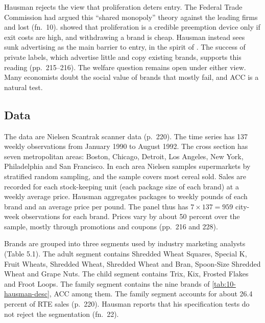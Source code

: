Hausman rejects the view that proliferation deters entry. The Federal Trade Commission had argued this
``shared monopoly'' theory against the leading firms and lost (fn.~10). \citet{Judd1985} showed that
proliferation is a credible preemption device only if exit costs are high, and withdrawing a brand is cheap.
Hausman instead sees sunk advertising as the main barrier to entry, in the spirit of \citet{Sutton1991}. The
success of private labels, which advertise little and copy existing brands, supports this reading
(pp.~215--216). The welfare question remains open under either view. Many economists doubt the social value
of brands that mostly fail, and ACC is a natural test.

\subsection{Data}\label{sec:10-hausman-data}

The data are Nielsen Scantrak scanner data (p.~220). The time series has 137 weekly observations from
January 1990 to August 1992. The cross section has seven metropolitan areas: Boston, Chicago, Detroit,
Los Angeles, New York, Philadelphia and San Francisco. In each area Nielsen samples supermarkets by
stratified random sampling, and the sample covers most cereal sold. Sales are recorded for each stock-keeping
unit (each package size of each brand) at a weekly average price. Hausman aggregates packages to weekly
pounds of each brand and an average price per pound. The panel thus has $7 \times 137 = 959$ city-week
observations for each brand. Prices vary by about 50 percent over the sample, mostly through promotions and
coupons (pp.~216 and 228).

Brands are grouped into three segments used by industry marketing analysts (Table 5.1). The adult segment
contains Shredded Wheat Squares, Special K, Fruit Wheats, Shredded Wheat, Shredded Wheat and Bran,
Spoon-Size Shredded Wheat and Grape Nuts. The child segment contains Trix, Kix, Frosted Flakes and Froot
Loops. The family segment contains the nine brands of \cref{tab:10-hausman-desc}, ACC among them. The family
segment accounts for about 26.4 percent of RTE sales (p.~220). Hausman reports that his specification tests
do not reject the segmentation (fn.~22).

